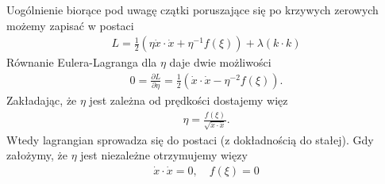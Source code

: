 Uogólnienie biorące pod uwagę czątki poruszające się
po krzywych zerowych możemy zapisać w 
postaci~\cite{polchinski_1998}
\begin{align}
L =  \frac{1}{2} \left(  
\eta \dot{x} \cdot \dot{x} +  \eta^{-1} f( \xi ) \right)  
+ \lambda ( k\cdot k )
\end{align}
Równanie Eulera-Lagranga dla $\eta$ daje dwie możliwości
\begin{align}
0 = \frac{\partial L }{\partial \eta} =  \frac{1}{2}
\left( \dot{x} \cdot \dot{x} -
\eta^{-2} f(\xi)  \right).
\end{align}
Zakładając, że $\eta$ jest zależna od prędkości 
dostajemy więz
\begin{align*}
\eta = \frac{f(\xi)}{\sqrt{\dot{x} \cdot \dot{x}}}.
\end{align*}
Wtedy lagrangian sprowadza się do postaci
(z dokładnością do stałej).
Gdy założymy, że $\eta$ jest niezależne otrzymujemy
więzy 
\begin{align}
\dot{x} \cdot \dot{x} = 0, \quad f(\xi) = 0
\end{align}






